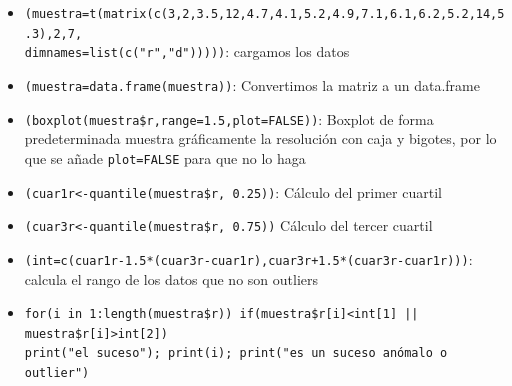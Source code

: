 \documentclass[a4paper, 12pt]{article}
\begin{document}
	\begin{itemize}
		\item \texttt{(muestra=t(matrix(c(3,2,3.5,12,4.7,4.1,5.2,4.9,7.1,6.1,6.2,5.2,14,5.3),2,7,\\dimnames=list(c("r","d")))))}: cargamos los datos
		\item \texttt{(muestra=data.frame(muestra))}: Convertimos la matriz a un data.frame
		\item \texttt{(boxplot(muestra\$r,range=1.5,plot=FALSE))}: Boxplot de forma predeterminada muestra gráficamente la resolución con caja y bigotes, por lo que se añade \texttt{plot=FALSE} para que no lo haga
		\item \texttt{(cuar1r<-quantile(muestra\$r, 0.25))}: Cálculo del primer cuartil
		\item \texttt{(cuar3r<-quantile(muestra\$r, 0.75))} Cálculo del tercer cuartil
		\item \texttt{(int=c(cuar1r-1.5*(cuar3r-cuar1r),cuar3r+1.5*(cuar3r-cuar1r)))}: calcula el rango de los datos que no son outliers
		\item \texttt{for(i in 1:length(muestra\$r)) {if(muestra\$r[i]<int[1] || muestra\$r[i]>int[2])\\ {print("el suceso"); print(i); print("es un suceso anómalo o outlier")}}}
	\end{itemize}
\end{document}
